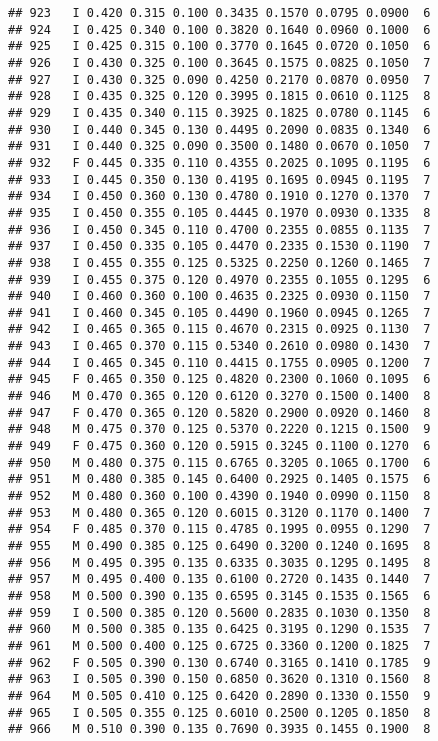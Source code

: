 \documentclass[
]{article}
\begin{document}
\begin{verbatim}
## 923   I 0.420 0.315 0.100 0.3435 0.1570 0.0795 0.0900  6
## 924   I 0.425 0.340 0.100 0.3820 0.1640 0.0960 0.1000  6
## 925   I 0.425 0.315 0.100 0.3770 0.1645 0.0720 0.1050  6
## 926   I 0.430 0.325 0.100 0.3645 0.1575 0.0825 0.1050  7
## 927   I 0.430 0.325 0.090 0.4250 0.2170 0.0870 0.0950  7
## 928   I 0.435 0.325 0.120 0.3995 0.1815 0.0610 0.1125  8
## 929   I 0.435 0.340 0.115 0.3925 0.1825 0.0780 0.1145  6
## 930   I 0.440 0.345 0.130 0.4495 0.2090 0.0835 0.1340  6
## 931   I 0.440 0.325 0.090 0.3500 0.1480 0.0670 0.1050  7
## 932   F 0.445 0.335 0.110 0.4355 0.2025 0.1095 0.1195  6
## 933   I 0.445 0.350 0.130 0.4195 0.1695 0.0945 0.1195  7
## 934   I 0.450 0.360 0.130 0.4780 0.1910 0.1270 0.1370  7
## 935   I 0.450 0.355 0.105 0.4445 0.1970 0.0930 0.1335  8
## 936   I 0.450 0.345 0.110 0.4700 0.2355 0.0855 0.1135  7
## 937   I 0.450 0.335 0.105 0.4470 0.2335 0.1530 0.1190  7
## 938   I 0.455 0.355 0.125 0.5325 0.2250 0.1260 0.1465  7
## 939   I 0.455 0.375 0.120 0.4970 0.2355 0.1055 0.1295  6
## 940   I 0.460 0.360 0.100 0.4635 0.2325 0.0930 0.1150  7
## 941   I 0.460 0.345 0.105 0.4490 0.1960 0.0945 0.1265  7
## 942   I 0.465 0.365 0.115 0.4670 0.2315 0.0925 0.1130  7
## 943   I 0.465 0.370 0.115 0.5340 0.2610 0.0980 0.1430  7
## 944   I 0.465 0.345 0.110 0.4415 0.1755 0.0905 0.1200  7
## 945   F 0.465 0.350 0.125 0.4820 0.2300 0.1060 0.1095  6
## 946   M 0.470 0.365 0.120 0.6120 0.3270 0.1500 0.1400  8
## 947   F 0.470 0.365 0.120 0.5820 0.2900 0.0920 0.1460  8
## 948   M 0.475 0.370 0.125 0.5370 0.2220 0.1215 0.1500  9
## 949   F 0.475 0.360 0.120 0.5915 0.3245 0.1100 0.1270  6
## 950   M 0.480 0.375 0.115 0.6765 0.3205 0.1065 0.1700  6
## 951   M 0.480 0.385 0.145 0.6400 0.2925 0.1405 0.1575  6
## 952   M 0.480 0.360 0.100 0.4390 0.1940 0.0990 0.1150  8
## 953   M 0.480 0.365 0.120 0.6015 0.3120 0.1170 0.1400  7
## 954   F 0.485 0.370 0.115 0.4785 0.1995 0.0955 0.1290  7
## 955   M 0.490 0.385 0.125 0.6490 0.3200 0.1240 0.1695  8
## 956   M 0.495 0.395 0.135 0.6335 0.3035 0.1295 0.1495  8
## 957   M 0.495 0.400 0.135 0.6100 0.2720 0.1435 0.1440  7
## 958   M 0.500 0.390 0.135 0.6595 0.3145 0.1535 0.1565  6
## 959   I 0.500 0.385 0.120 0.5600 0.2835 0.1030 0.1350  8
## 960   M 0.500 0.385 0.135 0.6425 0.3195 0.1290 0.1535  7
## 961   M 0.500 0.400 0.125 0.6725 0.3360 0.1200 0.1825  7
## 962   F 0.505 0.390 0.130 0.6740 0.3165 0.1410 0.1785  9
## 963   I 0.505 0.390 0.150 0.6850 0.3620 0.1310 0.1560  8
## 964   M 0.505 0.410 0.125 0.6420 0.2890 0.1330 0.1550  9
## 965   I 0.505 0.355 0.125 0.6010 0.2500 0.1205 0.1850  8
## 966   M 0.510 0.390 0.135 0.7690 0.3935 0.1455 0.1900  8

\end{verbatim}
\end{document}
